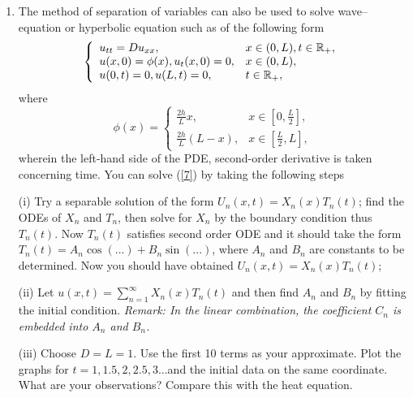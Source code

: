 \documentclass[6pt]{article}
\newtheorem{solution}{Solution}
\numberwithin{equation}{section}
\def\mathbb{\Bbb}
\begin{document}
\begin{enumerate}
\begin{solution}
We observe the aforementioned convergence to the average value as $t\rightarrow \infty$.   One important observation is that, the steady state is determined by the boundary condition, but not the initial data; moreover, for the problem backward in time, we can find that the solution \textbf{blows up} in time, i.e., $u(x,t)\rightarrow \infty$ as $t\rightarrow -\infty$ (at least for a subsequence of such $t$) for each fixed $x\in(0,L)$.
\end{solution}


\item  The method of separation of variables can also be used to solve wave--equation or hyperbolic equation such as of the following form
\begin{equation}\label{7}
\left\{
\begin{array}{ll}
u_{tt}=Du_{xx},& x\in(0,L),t\in \mathbb R_+,\\
u(x,0)=\phi(x), u_t(x,0)=0, &x\in(0,L),\\
u(0,t)=0, u(L,t)=0, &t\in \mathbb R_+,
\end{array}
\right.
\end{equation}
where
\[\phi(x)=
\left\{
\begin{array}{ll}
\frac{2h}{L}x, &x\in[0,\frac{L}{2}],\\
\frac{2h}{L}(L-x),& x\in[\frac{L}{2},L],
\end{array}
\right.
\]
wherein the left-hand side of the PDE, second-order derivative is taken concerning time.  You can solve (\ref{7}) by taking the following steps

(i)  Try a separable solution of the form $U_n(x,t)=X_n(x)T_n(t)$;  find the ODEs of $X_n$ and $T_n$, then solve for $X_n$ by the boundary condition thus $T_n(t)$.  Now $T_n(t)$ satisfies second order ODE and it should take the form $T_n(t)=A_n \cos(...)+B_n\sin (...)$, where $A_n$ and $B_n$ are constants to be determined.  Now you should have obtained $U_n(x,t)=X_n(x)T_n(t)$;

(ii) Let $u(x,t)=\sum^\infty_{n=1}X_n(x)T_n(t)$ and then find $A_n$ and $B_n$ by fitting the initial condition.  \emph{Remark:  In the linear combination, the coefficient $C_n$ is embedded into $A_n$ and $B_n$.}

(iii)  Choose $D=L=1$.  Use the first 10 terms as your approximate.  Plot the graphs for $t=1, 1.5, 2, 2.5, 3$...and the initial data on the same coordinate.  What are your observations? Compare this with the heat equation.


\end{enumerate}
\end{document}
